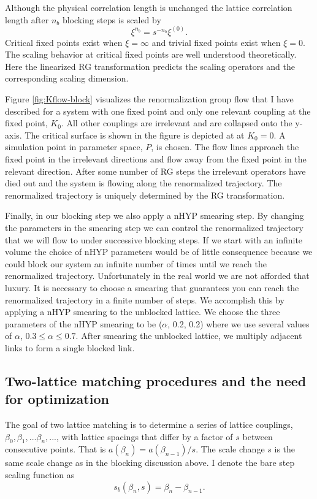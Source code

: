 Although the physical correlation length is unchanged the lattice correlation length after $n_b$ blocking steps is scaled by
\begin{equation}
  \label{eqn:xi}
  \xi^{n_b}=s^{-n_b}\xi^{(0)}.
\end{equation}
Critical fixed points exist when $\xi = \infty$ and trivial fixed points exist when $\xi = 0$.
The scaling behavior at critical fixed points are well understood theoretically.
Here the linearized RG transformation predicts the scaling operators and the corresponding scaling dimension.

Figure \ref{fig:Kflow-block} visualizes the renormalization group flow that I have described for a system with one fixed point and only one relevant coupling at the fixed point, $K_0$.
All other couplings are irrelevant and are collapsed onto the y-axis.
The critical surface is shown in the figure is depicted at at $K_0=0$.
A simulation point in parameter space, $P$, is chosen.
The flow lines approach the fixed point in the irrelevant directions and flow away from the fixed point in the relevant direction.
After some number of RG steps the irrelevant operators have died out and the system is flowing along the renormalized trajectory.
The renormalized trajectory is uniquely determined by the RG transformation.

Finally, in our blocking step we also apply a nHYP smearing step.
By changing the parameters in the smearing step we can control the renormalized trajectory that we will flow to under successive blocking steps.
If we start with an infinite volume the choice of nHYP parameters would be of little consequence because we could block our system an infinite number of times until we reach the renormalized trajectory.
Unfortunately in the real world we are not afforded that luxury.
It is necessary to choose a smearing that guarantees you can reach the renormalized trajectory in a finite number of steps.
We accomplish this by applying a nHYP smearing to the unblocked lattice.
We choose the three parameters of the nHYP smearing to be ($\alpha$, 0.2, 0.2) where we use several values of $\alpha$, $0.3 \leq \alpha \leq 0.7$. 
After smearing the unblocked lattice, we multiply adjacent links to form a single blocked link.

\subsection{Two-lattice matching procedures and the need for optimization} %
The goal of two lattice matching is to determine a series of lattice couplings, $\beta_0,\beta_1,...\beta_n,...$, with lattice spacings that differ by a factor of $s$ between consecutive points.
That is $a(\beta_n)=a(\beta_{n-1})/s$.
The scale change $s$ is the same scale change as in the blocking discussion above.
I denote the bare step scaling function as 
\begin{equation}
  s_b(\beta_n,s)=\beta_n-\beta_{n-1}.
\end{equation}

